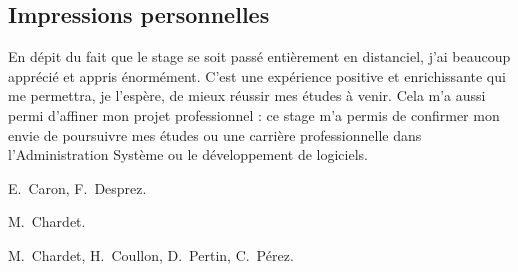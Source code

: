 \documentclass{article}
\begin{document}
\subsection{Impressions personnelles}
En dépit du fait que le stage se soit passé entièrement en distanciel, j'ai
beaucoup apprécié et appris énormément. C'est une expérience positive et
enrichissante qui me permettra, je l'espère, de mieux réussir mes études à
venir. Cela m'a aussi permi d'affiner mon projet professionnel : ce stage m'a
permis de confirmer mon envie de poursuivre mes études ou une carrière
professionnelle dans l'Administration Système ou le développement de logiciels.


\newpage



\begin{thebibliography}{10}


	E.~Caron, F.~Desprez.



	M.~Chardet.



	M.~Chardet, H.~Coullon, D.~Pertin, C.~Pérez.



\end{thebibliography}
\end{document}
